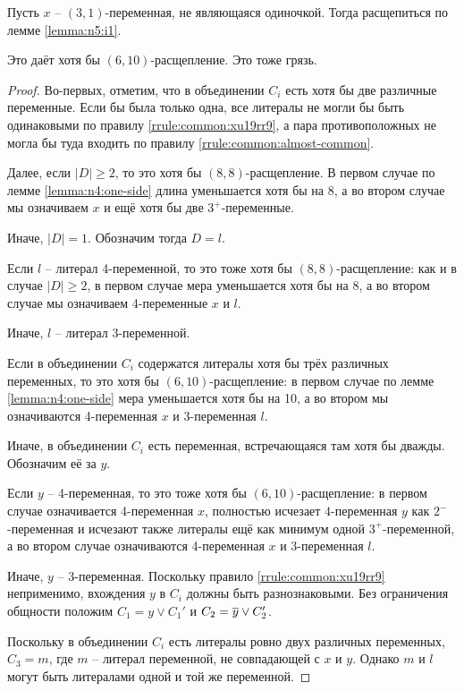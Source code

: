 \begin{brule}
 Пусть $x$ -- $(3,1)$-переменная, не являющаяся одиночкой. 
 Тогда расщепиться по лемме \ref{lemma:n5:i1}.

 Это даёт хотя бы $(6,10)$-расщепление.
 {\color{white} Это тоже грязь.}
 \label{brule:n4:31-ns}
\end{brule}

\begin{proof}
 Во-первых, отметим, что в объединении $C_i$ есть хотя бы две различные переменные.
 Если бы была только одна, все литералы не могли бы быть одинаковыми по правилу \ref{rrule:common:xu19rr9}, а пара противоположных не могла бы туда входить по правилу \ref{rrule:common:almost-common}.

 Далее, если $|D| \geq 2$, то это хотя бы $(8,8)$-расщепление. В первом случае по лемме \ref{lemma:n4:one-side} длина уменьшается хотя бы на 8, а во втором случае мы означиваем $x$ и ещё хотя бы две $3^+$-переменные.

 Иначе, $|D| = 1$. Обозначим тогда $D = l$.

 Если $l$ -- литерал 4-переменной, то это тоже хотя бы $(8,8)$-расщепление: как и в случае $|D| \geq 2$, в первом случае мера уменьшается хотя бы на 8, а во втором случае мы означиваем 4-переменные $x$ и $l$.

 Иначе, $l$ -- литерал 3-переменной.

 Если в объединении $C_i$ содержатся литералы хотя бы трёх различных переменных, то это хотя бы $(6,10)$-расщепление: в первом случае по лемме \ref{lemma:n4:one-side} мера уменьшается хотя бы на 10, а во втором мы означиваются 4-переменная $x$ и 3-переменная $l$.

 Иначе, в объединении $C_i$ есть переменная, встречающаяся там хотя бы дважды.
 Обозначим её за $y$.

 Если $y$ -- 4-переменная, то это тоже хотя бы $(6,10)$-расщепление: в первом случае означивается 4-переменная $x$, полностью исчезает $4$-переменная $y$ как $2^-$-переменная и исчезают также литералы ещё как минимум одной $3^+$-переменной, а во втором случае означиваются 4-переменная $x$ и 3-переменная $l$.

 Иначе, $y$ -- 3-переменная. Поскольку правило \ref{rrule:common:xu19rr9} неприменимо, вхождения $y$ в $C_i$ должны быть разнознаковыми. Без ограничения общности положим $C_1 = y \vee C_1'$ и $C_2 = \overline{y} \vee C_2'$.

 Поскольку в объединении $C_i$ есть литералы ровно двух различных переменных, $C_3 = m$, где $m$ -- литерал переменной, не совпадающей с $x$ и $y$. Однако $m$ и $l$ могут быть литералами одной и той же переменной.


\end{proof}
